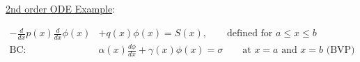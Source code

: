 \documentclass[12pt]{article}
\begin{document}
%

%

\vspace*{1em}
\underline{2nd order ODE Example}:

\begin{align}
-\frac{d}{dx}p(x) \frac{d}{dx}\phi(x) &+ q(x)\phi(x) = S(x), \qquad
\text{defined for } a \le x \le b \nonumber \\
\text{BC: }& \alpha(x)\frac{d\phi}{dx} + \gamma(x) \phi(x) = \sigma \qquad
\text{at } x=a \text{ and } x = b \text{ (BVP)}\nonumber
\end{align}
\end{document}
